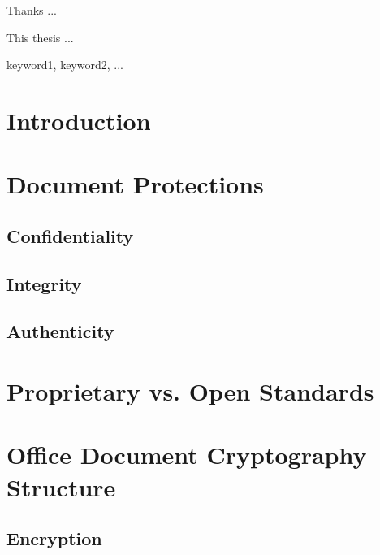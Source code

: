 \documentclass[11pt,oneside]{fithesis2}
\begin{document}
\FrontMatter
\ThesisTitlePage

\begin{ThesisDeclaration}
\DeclarationText
\AdvisorName
\end{ThesisDeclaration}

\begin{ThesisThanks}
Thanks ...
\end{ThesisThanks}

\begin{ThesisAbstract}
This thesis ...  
\end{ThesisAbstract}

\begin{ThesisKeyWords}
keyword1, keyword2, ...
\end{ThesisKeyWords}

\MainMatter

\tableofcontents 
\chapter{Introduction}

\chapter{Document Protections}

\section{Confidentiality}

\section{Integrity}

\section{Authenticity}

\chapter{Proprietary vs. Open Standards}

\chapter{Office Document Cryptography Structure}

\section{Encryption} 
\end{document}
